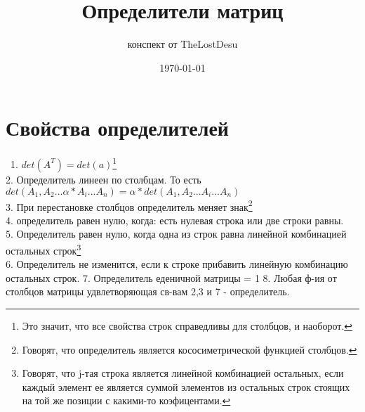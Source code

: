 \documentclass[a4paper,12pt]{article}
\author{конспект от TheLostDesu}
\title{Определители матриц}
\date{\today}
\begin{document}
\maketitle
\section{Свойства определителей}\
1. $det(A^T) = det(a)$\footnote{Это значит, что все свойства строк справедливы для столбцов, и наоборот.}\\
2. Определитель линеен по столбцам. То есть $det(A_1, A_2...\alpha * A_i...A_n) = \alpha * det(A_1, A_2...A_i...A_n)$\\
3. При перестановке столбцов определитель меняет знак\footnote{Говорят, что определитель является кососиметрической функцией столбцов.}\\
4. определитель равен нулю, когда: есть нулевая строка или две строки равны.\\
5. Определитель равен нулю, когда одна из строк равна линейной комбинацией остальных строк\footnote{Говорят, что j-тая строка является линейной комбинацией остальных, если каждый элемент ее является суммой элементов из остальных строк стоящих на той же позиции с какими-то коэфицентами.}\\
6. Определитель не изменится, если к строке прибавить линейную комбинацию остальных строк.
7. Определитель еденичной матрицы = 1
8. Любая ф-ия от столбцов матрицы удвлетворяющая св-вам 2,3 и 7 - определитель.
\end{document}
